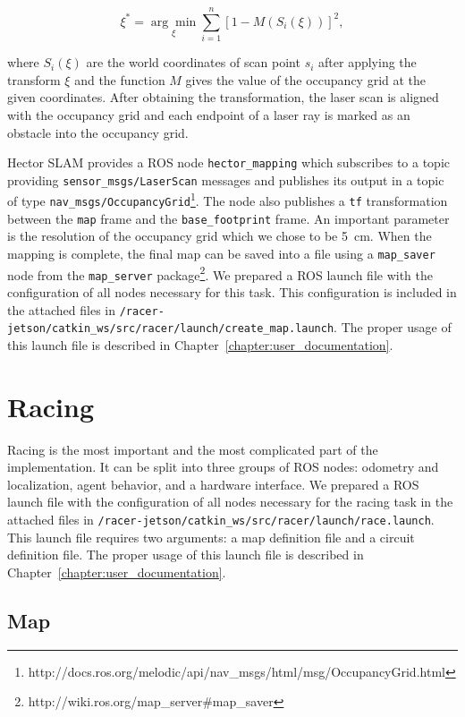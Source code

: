 $$
\xi^* = \underset{\xi}{\arg\min} \sum_{i=1}^n\left[ 1 - M\left( S_i\left( \xi\right)\right)\right]^2,
$$

where $S_i\left(\xi\right)$ are the world coordinates of scan point $s_i$ after applying the transform $\xi$ and the function $M$ gives the value of the occupancy grid at the given coordinates. After obtaining the transformation, the laser scan is aligned with the occupancy grid and each endpoint of a laser ray is marked as an obstacle into the occupancy grid.

Hector SLAM provides a \gls*{ROS} node \verb|hector_mapping| which subscribes to a topic providing \verb|sensor_msgs/LaserScan| messages and publishes its output in a topic of type \verb|nav_msgs/OccupancyGrid|\footnote{http://docs.ros.org/melodic/api/nav\_msgs/html/msg/OccupancyGrid.html}. The node also publishes a \verb|tf| transformation between the \verb|map| frame and the \verb|base_footprint| frame. An important parameter is the resolution of the occupancy grid which we chose to be \SI{5}{\centi\meter}. When the mapping is complete, the final map can be saved into a file using a \verb|map_saver| node from the \verb|map_server| package\footnote{http://wiki.ros.org/map\_server\#map\_saver}. We prepared a \gls*{ROS} launch file with the configuration of all nodes necessary for this task. This configuration is included in the attached files in \texttt{/racer-jetson/\allowbreak catkin\_ws/\allowbreak  src/\allowbreak  racer/\allowbreak  launch/create\_map.launch}. The proper usage of this launch file is described in Chapter~\ref{chapter:user_documentation}.

\section{Racing}

Racing is the most important and the most complicated part of the implementation. It can be split into three groups of \gls*{ROS} nodes: odometry and localization, agent behavior, and a hardware interface. We prepared a \gls*{ROS} launch file with the configuration of all nodes necessary for the racing task in the attached files in \newline\verb|/racer-jetson/catkin_ws/src/racer/launch/race.launch|. This launch file requires two arguments: a map definition file and a circuit definition file. The proper usage of this launch file is described in Chapter~\ref{chapter:user_documentation}.

\subsection{Map}

